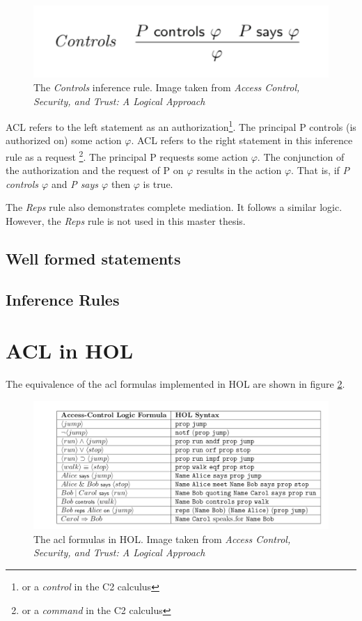 \documentclass[../../main/main.tex]{subfiles}
\begin{document}
\begin{figure}[h]
\centering
\includegraphics{../figures/ControlsInferenceRule}
\caption{\label{ControlsInferenceRule}The \textit{Controls} inference rule. Image taken from \textit{Access Control, Security, and Trust: A Logical Approach}\cite{ChinOlder}}
\end{figure}

ACL refers to the left statement as an authorization\footnote{or a \textit{control} in the C2 calculus}.  The principal P controls (is authorized on) some action $\varphi$. ACL refers to the right statement in this inference rule as a request \footnote{or a \textit{command} in the C2 calculus}.  The principal P requests some action $\varphi$. The conjunction of the authorization and the request of P on $\varphi$ results in the action $\varphi$.  That is, if \textit{P controls $\varphi$} and\textit{ P says $\varphi$} then $\varphi$  is true.  


The \textit{Reps} rule also demonstrates complete mediation.  It follows a similar logic.  However, the \textit{Reps} rule is not used in this master thesis.

\subsection{Well formed statements}
\subsection{Inference Rules}

\section{ACL in HOL} \label{sec:aclinhol}
The equivalence of the \gls{acl} formulas implemented in HOL are shown in figure \ref{aclformulasHOL}.

\begin{figure}[h]
\centering
\includegraphics[width=\textwidth]{../figures/aclformulasHOL}
\caption{\label{aclformulasHOL}The \gls{acl} formulas in HOL.  Image taken from \textit{Access Control, Security, and Trust: A Logical Approach}\cite{ChinOlder}}
\end{figure}
\end{document}
